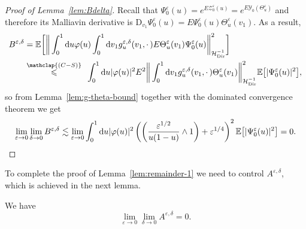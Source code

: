 \documentclass[AHL,Unicode,longabstracts]{cedram}
\DeclareMathOperator{\Dir}{Dir}
\newcommand{\mc}[1]{{\mathcal #1}}
\renewcommand{\mc}[1]{{\mathcal #1}}
\renewcommand{\leq}{\leqslant}
\newcommand*{\dd}{\mathrm{d}}
\newcommand*{\du}{\dd u}
\newcommand*{\dv}{\dd v}
\begin{document}
\begin{proof}[Proof of Lemma~\ref{lem:Bdelta}]
Recall that $\Psi_0^\varepsilon(u)=e^{E\mc Z_0^\varepsilon(u)} = e^{E \mc Y_0(\Theta^\varepsilon_u)}$ and therefore its Malliavin derivative is $\mathrm{D}_{v_1} \Psi^{\varepsilon}_0 (u) = E \Psi^{\varepsilon}_0 (u) \Theta^{\varepsilon}_u (v_1)$. As a result,
\begin{align*}
B^{\varepsilon, \delta} &=\mathbb{E} \bigg[\bigg\| \int_0^1 \du
\varphi (u) \int_0^1 \dv_1 g^{\varepsilon, \delta}_u (v_1, \cdot\,) E \Theta^{\varepsilon}_u (v_1) \Psi^{\varepsilon}_0 (u)
\bigg\|_{\mc H_{\Dir}^{- 1}}^2 \bigg]\\
&\overset{\mathclap{(C-S)}}{\leq} \;\,\int_0^1 \du | \varphi (u) |^2 E^2 \bigg\| \int_0^1 \dv_1 g^{\varepsilon, \delta}_u (v_1, \cdot\,) \Theta^{\varepsilon}_u (v_1) \bigg\|_{\mc H_{\Dir}^{- 1}}^2 \mathbb{E} \big[| \Psi^{\varepsilon}_0 (u) |^2\big],
\end{align*}
so from Lemma~\ref{lem:g-theta-bound} together with the dominated convergence theorem we get
\[
\lim_{\varepsilon \rightarrow 0} \lim_{\delta \rightarrow 0} B^{\varepsilon, \delta} \lesssim \lim_{\varepsilon \rightarrow 0}
\int_0^1 \du | \varphi (u) |^2 \left(\left(\frac{\varepsilon^{1/2}}{u (1 - u)} \wedge 1 \right) + \varepsilon^{1/4} \right)^2
\mathbb{E} \big[| \Psi^{\varepsilon}_0 (u) |^2\big] = 0. \qedhere
\]
\end{proof}

To complete the proof of Lemma~\ref{lem:remainder-1} we need to control $A^{\varepsilon, \delta}$, which is achieved in the next lemma.

\begin{lemm}\label{lem:Adelta}
We have
\[
\lim_{\varepsilon \rightarrow 0} \lim_{\delta \rightarrow 0} A^{\varepsilon, \delta} = 0.
\]
\end{lemm}
\end{document}
